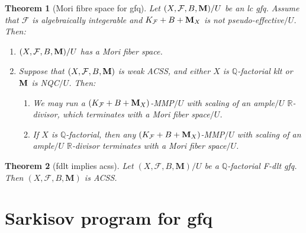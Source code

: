 \documentclass[11pt]{amsart}
\numberwithin{equation}{section}
\newcommand{\Mm}{{\bf{M}}}
\newcommand{\Qq}{\mathbb{Q}}
\newcommand{\Rr}{\mathbb{R}}
\newcommand{\Ff}{\mathcal{F}}
\newtheorem{thm}{Theorem}[subsection]
\theoremstyle{definition}
\theoremstyle{definition}
\theoremstyle{definition}
\begin{document}
\begin{thm}[Mori fibre space for gfq]\label{thm: existence mfs}
Let $(X,\Ff,B,\Mm)/U$ be an lc gfq. Assume that $\Ff$ is algebraically integerable and $K_{\Ff}+B+\Mm_X$ is not pseudo-effective$/U$. Then:
\begin{enumerate}
  \item $(X,\Ff,B,\Mm)/U$ has a Mori fiber space.
  \item Suppose that $(X,\Ff,B,\Mm)$ is weak ACSS, and either $X$ is $\Qq$-factorial klt or $\Mm$ is NQC$/U$. Then:
  \begin{enumerate}
    \item We may run a $(K_{\Ff}+B+\Mm_X)$-MMP$/U$ with scaling of an ample$/U$ $\Rr$-divisor, which terminates with a Mori fiber space$/U$.
    \item If $X$ is $\Qq$-factorial, then any $(K_{\Ff}+B+\Mm_X)$-MMP$/U$ with scaling of an ample$/U$ $\Rr$-divisor terminates with a Mori fiber space$/U$.
   \end{enumerate}
   \end{enumerate}
\end{thm}

\begin{thm}[fdlt implies acss]\label{thm: fdlt is acss}
    Let $(X,\mathcal{F},B,\mathbf{M})/U$ be a $\mathbb{Q}$-factorial F-dlt gfq. Then $(X,\mathcal{F},B,\mathbf{M})$ is ACSS.
\end{thm}

\section{Sarkisov program for gfq}


\end{document}
